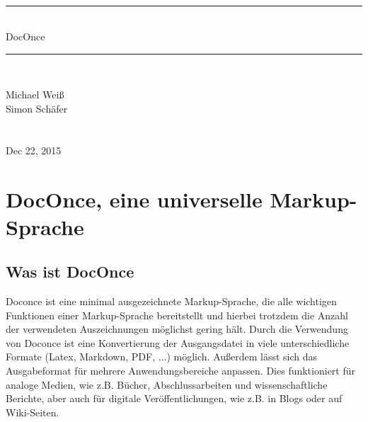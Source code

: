 \documentclass[%
oneside,                 %
final,                   %
chapterprefix=true,      %
open=right,              %
10pt]{book}
\begin{document}






\thispagestyle{empty}
\hbox{\ \ }
\vfill
\begin{center}
{\huge{\bfseries{
\begin{spacing}{1.25}
{\rule{\linewidth}{0.5mm}} \\[0.4cm]
{DocOnce}
\\[0.4cm] {\rule{\linewidth}{0.5mm}} \\[1.5cm]
\end{spacing}
}}}


\vspace{0.5cm}

{\Large\textsf{Michael Weiß${}^{}$}}\\ [3mm]

{\Large\textsf{Simon Schäfer${}^{}$}}\\ [3mm]

\ \\ [2mm]


\ \\ [10mm]
{\large\textsf{Dec 22, 2015}}

\end{center}
\vfill
\clearpage

\tableofcontents


\vspace{1cm} %




\chapter{DocOnce, eine universelle Markup-Sprache}
\section{Was ist DocOnce}
Doconce ist eine minimal ausgezeichnete Markup-Sprache, die alle wichtigen Funktionen einer Markup-Sprache bereitstellt und hierbei trotzdem die Anzahl der verwendeten Auszeichnungen möglichst gering hält. Durch die Verwendung von Doconce ist eine Konvertierung der Ausgangsdatei in viele unterschiedliche Formate (Latex, Markdown, PDF, ...) möglich. Außerdem lässt sich das Ausgabeformat für mehrere Anwendungsbereiche anpassen. Dies funktioniert für analoge Medien, wie z.B. Bücher, Abschlussarbeiten und wissenschaftliche Berichte, aber auch für digitale Veröffentlichungen, wie z.B. in Blogs oder auf Wiki-Seiten.
\end{document}
